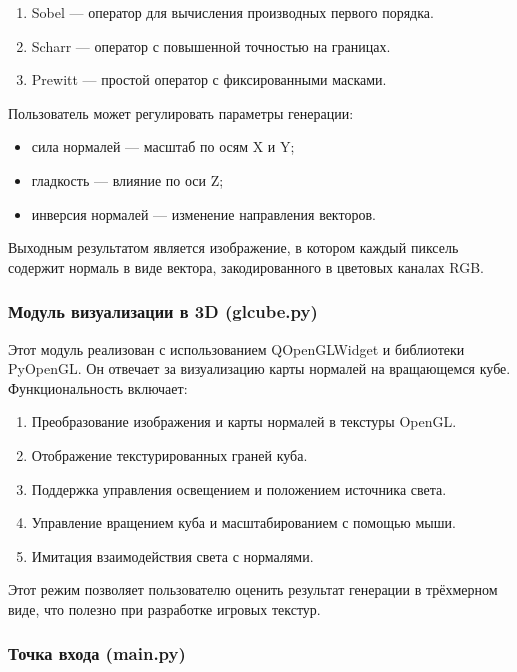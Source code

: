 \begin{enumerate}
	\item Sobel — оператор для вычисления производных первого порядка.
	\item Scharr — оператор с повышенной точностью на границах.
	\item Prewitt — простой оператор с фиксированными масками.
\end{enumerate}

Пользователь может регулировать параметры генерации:
\begin{itemize}
	\item сила нормалей — масштаб по осям X и Y;
	\item гладкость — влияние по оси Z;
	\item инверсия нормалей — изменение направления векторов.
\end{itemize}

Выходным результатом является изображение, в котором каждый пиксель содержит нормаль в виде вектора, закодированного в цветовых каналах RGB.

\subsubsection{Модуль визуализации в 3D (glcube.py)}

Этот модуль реализован с использованием QOpenGLWidget и библиотеки PyOpenGL. Он отвечает за визуализацию карты нормалей на вращающемся кубе. Функциональность включает:

\begin{enumerate}
	\item Преобразование изображения и карты нормалей в текстуры OpenGL.
	\item Отображение текстурированных граней куба.
	\item Поддержка управления освещением и положением источника света.
	\item Управление вращением куба и масштабированием с помощью мыши.
	\item Имитация взаимодействия света с нормалями.
\end{enumerate}

Этот режим позволяет пользователю оценить результат генерации в трёхмерном виде, что полезно при разработке игровых текстур.

\subsubsection{Точка входа (main.py)}

